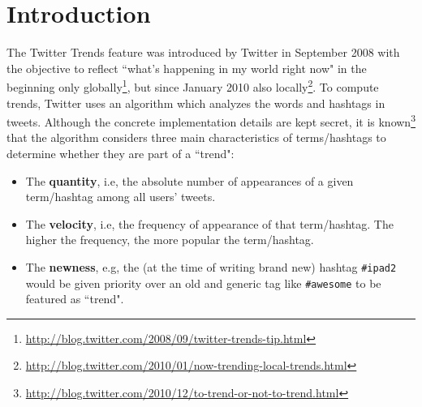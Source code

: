 \documentclass[runningheads,a4paper]{llncs}
\begin{document}
\section{Introduction}\label{sec:introduction}
The Twitter Trends feature was introduced by Twitter in September 2008 with the objective to reflect ``what's happening in my world right now" in the beginning only globally\footnote{\url{http://blog.twitter.com/2008/09/twitter-trends-tip.html}}, but since January 2010 also locally\footnote{\url{http://blog.twitter.com/2010/01/now-trending-local-trends.html}}. To compute trends, Twitter uses an algorithm which analyzes the words and hashtags in tweets. Although the concrete implementation details are kept secret, it is known\footnote{\url{http://blog.twitter.com/2010/12/to-trend-or-not-to-trend.html}} that the algorithm considers three main characteristics of terms/hashtags to determine whether they are part of a ``trend":

\begin{itemize}
\item The \textbf{quantity}, i.e, the absolute number of appearances of a given term/hashtag among all users' tweets.
\item The \textbf{velocity}, i.e, the frequency of appearance of that term/hashtag. The higher the frequency, the more popular the term/hashtag.
\item The \textbf{newness}, e.g, the (at the time of writing brand new) hashtag \texttt{\#ipad2} would be given priority over an old and generic tag like \texttt{\#awesome} to be featured as ``trend".
\end{itemize}

\end{document}
